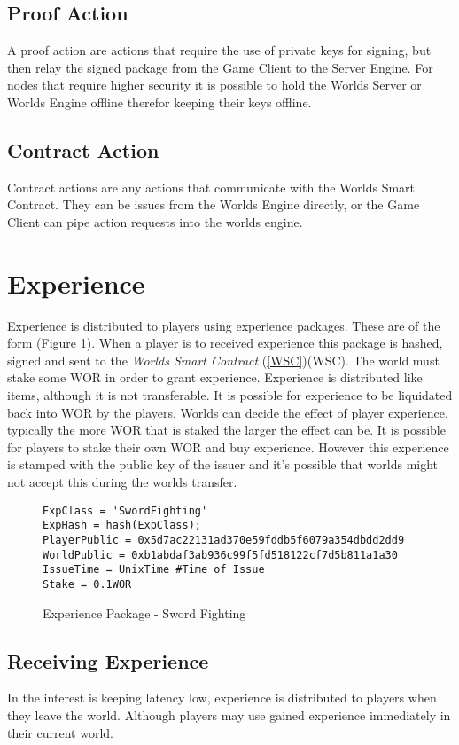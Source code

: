 \documentclass[runningheads,a4paper]{llncs}
\begin{document}
\subsection{Proof Action}
A proof action are actions that require the use of private keys for signing, but then relay the signed package from the Game Client to the Server Engine. For nodes that require higher security it is possible to hold the Worlds Server or Worlds Engine offline therefor keeping their keys offline. 

\subsection{Contract Action}
Contract actions are any actions that communicate with the Worlds Smart Contract. They can be issues from the Worlds Engine directly, or the Game Client can pipe action requests into the worlds engine. 

\section{Experience}
\label{exp}
Experience is distributed to players using experience packages. These are of the form (Figure \ref{exppkg}). When a player is to received experience this package is hashed, signed and sent to the \textit{Worlds Smart Contract} (\ref{WSC})(WSC). The world must stake some WOR in order to grant experience. Experience is distributed like items, although it is not transferable. It is possible for experience to be liquidated back into WOR by the players. Worlds can decide the effect of player experience, typically the more WOR that is staked the larger the effect can be. It is possible for players to stake their own WOR and buy experience. However this experience is stamped with the public key of the issuer and it's possible that worlds might not accept this during the worlds transfer. 

\begin{figure}[H]
\centering
\caption{Experience Package - Sword Fighting}
\label{exppkg}
\begin{lstlisting}
ExpClass = 'SwordFighting'
ExpHash = hash(ExpClass);
PlayerPublic = 0x5d7ac22131ad370e59fddb5f6079a354dbdd2dd9
WorldPublic = 0xb1abdaf3ab936c99f5fd518122cf7d5b811a1a30
IssueTime = UnixTime #Time of Issue
Stake = 0.1WOR
\end{lstlisting}
\end{figure}

\subsection{Receiving Experience} 
In the interest is keeping latency low, experience is distributed to players when they leave the world. Although players may use gained experience immediately in their current world. 
\end{document}
